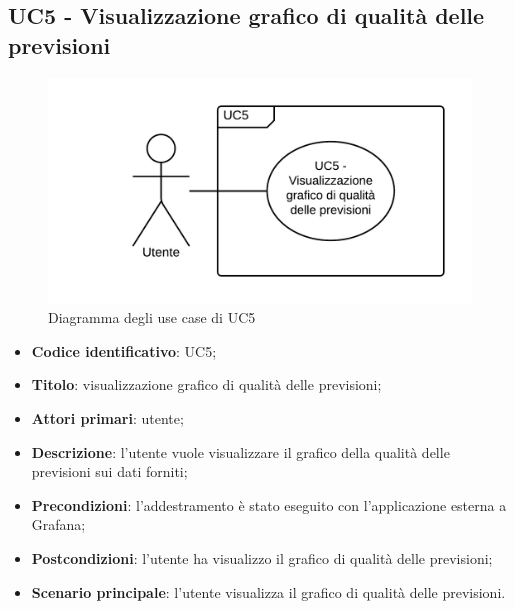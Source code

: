 \subsection{UC5 - Visualizzazione grafico di qualità delle previsioni}
\begin{figure}[H]
\includegraphics{img/UC5_-_Visualizzazione_grafico_di_qualita_delle_previsioni.png}
\caption{Diagramma degli use case di UC5}
\end{figure}
\begin{itemize}
	\item \textbf{Codice identificativo}: UC5;
	\item \textbf{Titolo}: visualizzazione grafico di qualità delle previsioni;
	\item \textbf{Attori primari}: utente;
	\item \textbf{Descrizione}: l'utente vuole visualizzare il grafico della qualità delle previsioni sui dati forniti;
	\item \textbf{Precondizioni}: l'addestramento è stato eseguito con l'applicazione esterna a Grafana\glo;
	\item \textbf{Postcondizioni}: l'utente ha visualizzo il grafico di qualità delle previsioni;
	\item \textbf{Scenario principale}: l'utente visualizza il grafico di qualità delle previsioni.
\end{itemize} 
